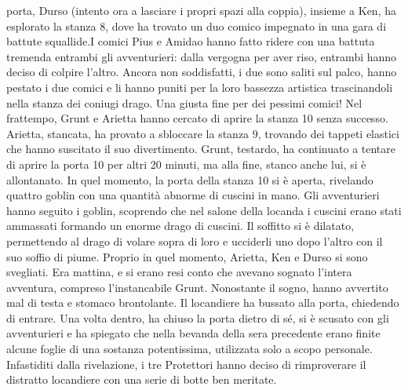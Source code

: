porta, Durso (intento ora a lasciare i propri spazi alla coppia),
insieme a Ken, ha esplorato la stanza 8, dove ha trovato un duo comico
impegnato in una gara di battute squallide.I comici Pius e Amidao hanno
fatto ridere con una battuta tremenda entrambi gli avventurieri: dalla
vergogna per aver riso, entrambi hanno deciso di colpire l'altro. Ancora
non soddisfatti, i due sono saliti sul palco, hanno pestato i due comici
e li hanno puniti per la loro bassezza artistica trascinandoli nella
stanza dei coniugi drago. Una giusta fine per dei pessimi comici! Nel
frattempo, Grunt e Arietta hanno cercato di aprire la stanza 10 senza
successo. Arietta, stancata, ha provato a sbloccare la stanza 9,
trovando dei tappeti elastici che hanno suscitato il suo divertimento.
Grunt, testardo, ha continuato a tentare di aprire la porta 10 per altri
20 minuti, ma alla fine, stanco anche lui, si è allontanato. In quel
momento, la porta della stanza 10 si è aperta, rivelando quattro goblin
con una quantità abnorme di cuscini in mano. Gli avventurieri hanno
seguito i goblin, scoprendo che nel salone della locanda i cuscini erano
stati ammassati formando un enorme drago di cuscini. Il soffitto si è
dilatato, permettendo al drago di volare sopra di loro e ucciderli uno
dopo l'altro con il suo soffio di piume. Proprio in quel momento,
Arietta, Ken e Durso si sono svegliati. Era mattina, e si erano resi
conto che avevano sognato l'intera avventura, compreso l'instancabile
Grunt. Nonostante il sogno, hanno avvertito mal di testa e stomaco
brontolante. Il locandiere ha bussato alla porta, chiedendo di entrare.
Una volta dentro, ha chiuso la porta dietro di sé, si è scusato con gli
avventurieri e ha spiegato che nella bevanda della sera precedente erano
finite alcune foglie di una sostanza potentissima, utilizzata solo a
scopo personale. Infastiditi dalla rivelazione, i tre Protettori hanno
deciso di rimproverare il distratto locandiere con una serie di botte
ben meritate.
